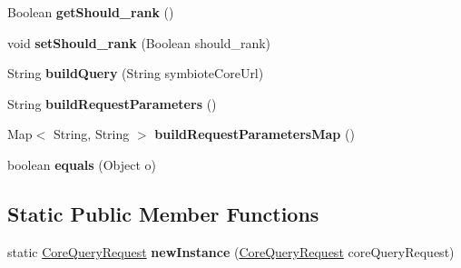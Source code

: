 \begin{DoxyCompactItemize}
Boolean {\bfseries get\+Should\+\_\+rank} ()
\item 
\mbox{\label{classeu_1_1h2020_1_1symbiote_1_1core_1_1internal_1_1CoreQueryRequest_a7a59c6369087922573ec4e80c9c0c614}} 
void {\bfseries set\+Should\+\_\+rank} (Boolean should\+\_\+rank)
\item 
\mbox{\label{classeu_1_1h2020_1_1symbiote_1_1core_1_1internal_1_1CoreQueryRequest_a0472d4347b6538f41c2f776dee82e310}} 
String {\bfseries build\+Query} (String symbiote\+Core\+Url)
\item 
\mbox{\label{classeu_1_1h2020_1_1symbiote_1_1core_1_1internal_1_1CoreQueryRequest_ad0c20f9704a23bf1c35f1e5b00ee36dd}} 
String {\bfseries build\+Request\+Parameters} ()
\item 
\mbox{\label{classeu_1_1h2020_1_1symbiote_1_1core_1_1internal_1_1CoreQueryRequest_a58f1dc0adef36bed7ec0e3d5423e30d4}} 
Map$<$ String, String $>$ {\bfseries build\+Request\+Parameters\+Map} ()
\item 
\mbox{\label{classeu_1_1h2020_1_1symbiote_1_1core_1_1internal_1_1CoreQueryRequest_a7c012b351d903a9ee35e087cb2c7c468}} 
boolean {\bfseries equals} (Object o)
\end{DoxyCompactItemize}
\subsection*{Static Public Member Functions}
\begin{DoxyCompactItemize}
\item 
\mbox{\label{classeu_1_1h2020_1_1symbiote_1_1core_1_1internal_1_1CoreQueryRequest_af52c71681b257b37a5221813aa0e9309}} 
static \hyperlink{classeu_1_1h2020_1_1symbiote_1_1core_1_1internal_1_1CoreQueryRequest}{Core\+Query\+Request} {\bfseries new\+Instance} (\hyperlink{classeu_1_1h2020_1_1symbiote_1_1core_1_1internal_1_1CoreQueryRequest}{Core\+Query\+Request} core\+Query\+Request)
\end{DoxyCompactItemize}



